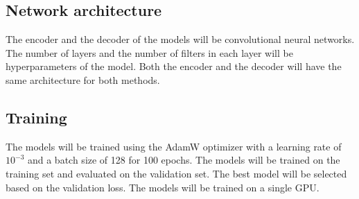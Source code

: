 \subsection{Network architecture}

The encoder and the decoder of the models will be convolutional neural networks. The number of layers and the number of filters in each layer will be hyperparameters of the model. 
Both the encoder and the decoder will have the same architecture for both methods. 

\subsection{Training}

The models will be trained using the AdamW optimizer with a learning rate of $10^{-3}$ and a batch size of 128 for 100 epochs. The models will be trained on the training set and evaluated on the validation set. The best model will be selected based on the validation loss. The models will be trained on a single GPU.